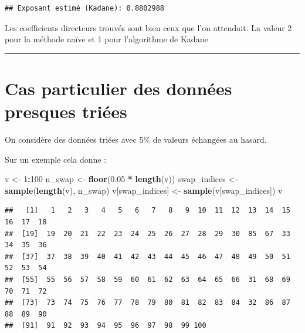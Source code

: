 \documentclass[
]{article}
\newenvironment{Shaded}{\begin{snugshade}}{\end{snugshade}}
\newcommand{\DecValTok}[1]{\textcolor[rgb]{0.00,0.00,0.81}{#1}}
\newcommand{\FloatTok}[1]{\textcolor[rgb]{0.00,0.00,0.81}{#1}}
\newcommand{\FunctionTok}[1]{\textcolor[rgb]{0.13,0.29,0.53}{\textbf{#1}}}
\newcommand{\NormalTok}[1]{#1}
\newcommand{\OtherTok}[1]{\textcolor[rgb]{0.56,0.35,0.01}{#1}}
\newcommand{\SpecialCharTok}[1]{\textcolor[rgb]{0.81,0.36,0.00}{\textbf{#1}}}
\begin{document}
\begin{verbatim}
## Exposant estimé (Kadane): 0.8802988
\end{verbatim}

Les coefficients directeurs trouvés sont bien ceux que l'on attendait.
La valeur 2 pour la méthode naïve et 1 pour l'algorithme de Kadane

\begin{center}\rule{0.5\linewidth}{0.5pt}\end{center}

\section{Cas particulier des données presques
triées}\label{cas-particulier-des-donnuxe9es-presques-triuxe9es}

On considère des données triées avec 5\% de valeurs échangées au hasard.

Sur un exemple cela donne :

\begin{Shaded}
\begin{Highlighting}[]
\NormalTok{v }\OtherTok{\textless{}{-}} \DecValTok{1}\SpecialCharTok{:}\DecValTok{100}
\NormalTok{n\_swap }\OtherTok{\textless{}{-}} \FunctionTok{floor}\NormalTok{(}\FloatTok{0.05} \SpecialCharTok{*} \FunctionTok{length}\NormalTok{(v))}
\NormalTok{swap\_indices }\OtherTok{\textless{}{-}} \FunctionTok{sample}\NormalTok{(}\FunctionTok{length}\NormalTok{(v), n\_swap)}
\NormalTok{v[swap\_indices] }\OtherTok{\textless{}{-}} \FunctionTok{sample}\NormalTok{(v[swap\_indices])}
\NormalTok{v}
\end{Highlighting}
\end{Shaded}

\begin{verbatim}
##   [1]   1   2   3   4   5   6   7   8   9  10  11  12  13  14  15  16  17  18
##  [19]  19  20  21  22  23  24  25  26  27  28  29  30  85  67  33  34  35  36
##  [37]  37  38  39  40  41  42  43  44  45  46  47  48  49  50  51  52  53  54
##  [55]  55  56  57  58  59  60  61  62  63  64  65  66  31  68  69  70  71  72
##  [73]  73  74  75  76  77  78  79  80  81  82  83  84  32  86  87  88  89  90
##  [91]  91  92  93  94  95  96  97  98  99 100
\end{verbatim}
\end{document}
